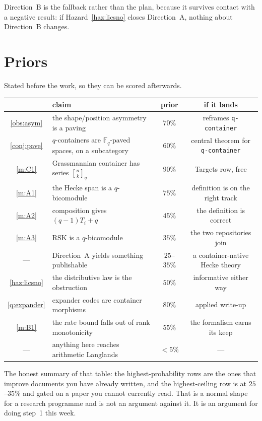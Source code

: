\documentclass[11pt,a4paper]{article}
\theoremstyle{definition}
\theoremstyle{remark}
\newcommand{\FF}{\mathbb{F}}
\newcommand{\qbin}[2]{\genfrac{[}{]}{0pt}{}{#1}{#2}_{q}}
\begin{document}
Direction~B is the fallback rather than the plan, because it survives contact
with a negative result: if Hazard~\ref{haz:licsno} closes Direction~A, nothing
about Direction~B changes.

\section{Priors}\label{sec:priors}

Stated before the work, so they can be scored afterwards.

\begin{center}
\small
\setlength{\tabcolsep}{4pt}
\begin{tabular}{@{}clcc@{}}
\toprule
& claim & prior & if it lands \\
\midrule
\ref{obs:asym} & the shape/position asymmetry is a paving & $70\%$
  & reframes \texttt{q-container} \\
\ref{conj:pave} & $q$-containers are $\FF_q$-paved spaces, on a subcategory
  & $60\%$ & central theorem for \texttt{q-container} \\
\ref{m:C1} & Grassmannian container has series $\qbin{n}{k}$ & $90\%$
  & Targets row, free \\
\ref{m:A1} & the Hecke span is a $q$-bicomodule & $75\%$
  & definition is on the right track \\
\ref{m:A2} & composition gives $(q-1)T_i + q$ & $45\%$
  & the definition is correct \\
\ref{m:A3} & RSK is a $q$-bicomodule & $35\%$
  & the two repositories join \\
--- & Direction~A yields something publishable & $25$--$35\%$
  & a container-native Hecke theory \\
\ref{haz:licsno} & the distributive law is the obstruction & $50\%$
  & informative either way \\
\ref{q:expander} & expander codes are container morphisms & $80\%$
  & applied write-up \\
\ref{m:B1} & the rate bound falls out of rank monotonicity & $55\%$
  & the formalism earns its keep \\
--- & anything here reaches arithmetic Langlands & $<5\%$
  & --- \\
\bottomrule
\end{tabular}
\end{center}

The honest summary of that table: the highest-probability rows are the ones that
improve documents you have already written, and the highest-ceiling row is at
$25$--$35\%$ and gated on a paper you cannot currently read. That is a normal
shape for a research programme and is not an argument against it. It is an
argument for doing step~1 this week.
\end{document}
